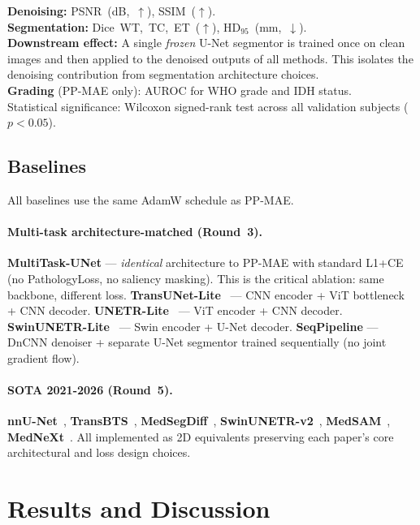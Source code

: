 \documentclass[runningheads]{llncs}
\begin{document}
\noindent\textbf{Denoising:} PSNR~(dB,~$\uparrow$), SSIM~($\uparrow$).\\
\textbf{Segmentation:} Dice~WT,~TC,~ET~($\uparrow$),
  HD$_{95}$~(mm,~$\downarrow$).\\
\textbf{Downstream effect:} A single \emph{frozen} U-Net segmentor
is trained once on clean images and then applied to the denoised
outputs of all methods.
This isolates the denoising contribution from segmentation
architecture choices.\\
\textbf{Grading} (PP-MAE only): AUROC for WHO grade and IDH status.\\
Statistical significance: Wilcoxon signed-rank test across all
validation subjects ($p < 0.05$).

\subsection{Baselines}

All baselines use the same AdamW schedule as PP-MAE.

\paragraph{Multi-task architecture-matched (Round~3).}
\textbf{MultiTask-UNet} — \emph{identical} architecture to PP-MAE
with standard L1+CE (no PathologyLoss, no saliency masking).
This is the critical ablation: same backbone, different loss.
\textbf{TransUNet-Lite}~\cite{transunet} — CNN encoder + ViT
bottleneck + CNN decoder.
\textbf{UNETR-Lite}~\cite{unetr} — ViT encoder + CNN decoder.
\textbf{SwinUNETR-Lite}~\cite{swinunetr} — Swin encoder + U-Net decoder.
\textbf{SeqPipeline} — DnCNN denoiser + separate U-Net segmentor
trained sequentially (no joint gradient flow).

\paragraph{SOTA 2021-2026 (Round~5).}
\textbf{nnU-Net}~\cite{nnunet},
\textbf{TransBTS}~\cite{transbts},
\textbf{MedSegDiff}~\cite{medsegdiff},
\textbf{SwinUNETR-v2}~\cite{swinunetrv2},
\textbf{MedSAM}~\cite{medsam},
\textbf{MedNeXt}~\cite{mednext}.
All implemented as 2D equivalents preserving each paper's
core architectural and loss design choices.


\section{Results and Discussion}
\label{sec:results}
\end{document}
